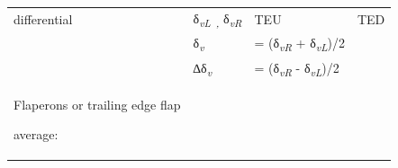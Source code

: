 \documentclass[
]{book}
\begin{document}
\begin{longtable}[]{@{}llll@{}}
\begin{minipage}[t]{0.27\columnwidth}
differential\strut
\end{minipage} & \begin{minipage}[t]{0.17\columnwidth}\raggedright
δ\emph{\textsubscript{vL~,}} δ\emph{\textsubscript{vR}}\strut
\end{minipage} & \begin{minipage}[t]{0.22\columnwidth}\raggedright
TEU\strut
\end{minipage} & \begin{minipage}[t]{0.22\columnwidth}\raggedright
TED\strut
\end{minipage}\tabularnewline
\begin{minipage}[t]{0.27\columnwidth}\raggedright
\strut
\end{minipage} & \begin{minipage}[t]{0.17\columnwidth}\raggedright
δ\emph{\textsubscript{v}}\strut
\end{minipage} & \begin{minipage}[t]{0.22\columnwidth}\raggedright
= (δ\emph{\textsubscript{vR}} + δ\emph{\textsubscript{vL}})/2\strut
\end{minipage} & \begin{minipage}[t]{0.22\columnwidth}\raggedright
\strut
\end{minipage}\tabularnewline
\begin{minipage}[t]{0.27\columnwidth}\raggedright
\strut
\end{minipage} & \begin{minipage}[t]{0.17\columnwidth}\raggedright
∆δ\emph{\textsubscript{v}}\strut
\end{minipage} & \begin{minipage}[t]{0.22\columnwidth}\raggedright
= (δ\emph{\textsubscript{vR}} - δ\emph{\textsubscript{vL}})/2\strut
\end{minipage} & \begin{minipage}[t]{0.22\columnwidth}\raggedright
\strut
\end{minipage}\tabularnewline
\begin{minipage}[t]{0.27\columnwidth}\raggedright
Flaperons or trailing edge flap

average:


\end{minipage}
\end{longtable}
\end{document}

